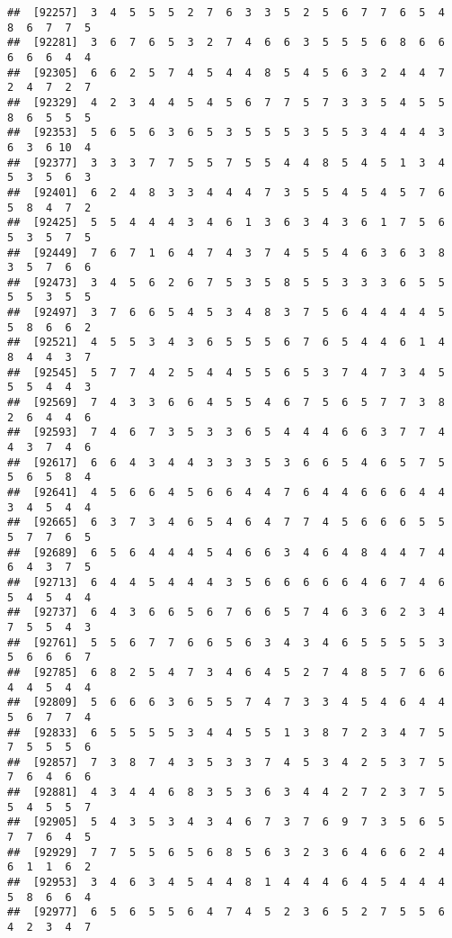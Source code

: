 \documentclass[
]{book}
\begin{document}
\begin{verbatim}
##  [92257]  3  4  5  5  5  2  7  6  3  3  5  2  5  6  7  7  6  5  4  8  6  7  7  5
##  [92281]  3  6  7  6  5  3  2  7  4  6  6  3  5  5  5  6  8  6  6  6  6  6  4  4
##  [92305]  6  6  2  5  7  4  5  4  4  8  5  4  5  6  3  2  4  4  7  2  4  7  2  7
##  [92329]  4  2  3  4  4  5  4  5  6  7  7  5  7  3  3  5  4  5  5  8  6  5  5  5
##  [92353]  5  6  5  6  3  6  5  3  5  5  5  3  5  5  3  4  4  4  3  6  3  6 10  4
##  [92377]  3  3  3  7  7  5  5  7  5  5  4  4  8  5  4  5  1  3  4  5  3  5  6  3
##  [92401]  6  2  4  8  3  3  4  4  4  7  3  5  5  4  5  4  5  7  6  5  8  4  7  2
##  [92425]  5  5  4  4  4  3  4  6  1  3  6  3  4  3  6  1  7  5  6  5  3  5  7  5
##  [92449]  7  6  7  1  6  4  7  4  3  7  4  5  5  4  6  3  6  3  8  3  5  7  6  6
##  [92473]  3  4  5  6  2  6  7  5  3  5  8  5  5  3  3  3  6  5  5  5  5  3  5  5
##  [92497]  3  7  6  6  5  4  5  3  4  8  3  7  5  6  4  4  4  4  5  5  8  6  6  2
##  [92521]  4  5  5  3  4  3  6  5  5  5  6  7  6  5  4  4  6  1  4  8  4  4  3  7
##  [92545]  5  7  7  4  2  5  4  4  5  5  6  5  3  7  4  7  3  4  5  5  5  4  4  3
##  [92569]  7  4  3  3  6  6  4  5  5  4  6  7  5  6  5  7  7  3  8  2  6  4  4  6
##  [92593]  7  4  6  7  3  5  3  3  6  5  4  4  4  6  6  3  7  7  4  4  3  7  4  6
##  [92617]  6  6  4  3  4  4  3  3  3  5  3  6  6  5  4  6  5  7  5  5  6  5  8  4
##  [92641]  4  5  6  6  4  5  6  6  4  4  7  6  4  4  6  6  6  4  4  3  4  5  4  4
##  [92665]  6  3  7  3  4  6  5  4  6  4  7  7  4  5  6  6  6  5  5  5  7  7  6  5
##  [92689]  6  5  6  4  4  4  5  4  6  6  3  4  6  4  8  4  4  7  4  6  4  3  7  5
##  [92713]  6  4  4  5  4  4  4  3  5  6  6  6  6  6  4  6  7  4  6  5  4  5  4  4
##  [92737]  6  4  3  6  6  5  6  7  6  6  5  7  4  6  3  6  2  3  4  7  5  5  4  3
##  [92761]  5  5  6  7  7  6  6  5  6  3  4  3  4  6  5  5  5  5  3  5  6  6  6  7
##  [92785]  6  8  2  5  4  7  3  4  6  4  5  2  7  4  8  5  7  6  6  4  4  5  4  4
##  [92809]  5  6  6  6  3  6  5  5  7  4  7  3  3  4  5  4  6  4  4  5  6  7  7  4
##  [92833]  6  5  5  5  5  3  4  4  5  5  1  3  8  7  2  3  4  7  5  7  5  5  5  6
##  [92857]  7  3  8  7  4  3  5  3  3  7  4  5  3  4  2  5  3  7  5  7  6  4  6  6
##  [92881]  4  3  4  4  6  8  3  5  3  6  3  4  4  2  7  2  3  7  5  5  4  5  5  7
##  [92905]  5  4  3  5  3  4  3  4  6  7  3  7  6  9  7  3  5  6  5  7  7  6  4  5
##  [92929]  7  7  5  5  6  5  6  8  5  6  3  2  3  6  4  6  6  2  4  6  1  1  6  2
##  [92953]  3  4  6  3  4  5  4  4  8  1  4  4  4  6  4  5  4  4  4  5  8  6  6  4
##  [92977]  6  5  6  5  5  6  4  7  4  5  2  3  6  5  2  7  5  5  6  4  2  3  4  7

\end{verbatim}
\end{document}

